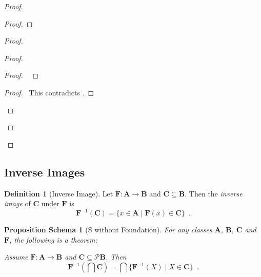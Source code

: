 \documentclass{book}
\let\qed\relax
\newtheorem{props}[ax]{Proposition Schema}
\theoremstyle{definition}
\newtheorem{df}[ax]{Definition}
\begin{document}
\begin{proof}
\pf
{}
\begin{proof}
\end{proof}
\begin{proof}
	\begin{proof}
		\begin{proof}
			\pf\ 
		\end{proof}
		\qedstep
		\begin{proof}
			\pf\ This contradicts .
		\end{proof}
	\end{proof}
\end{proof}
\qed
\end{proof}

\subsection{Inverse Images}

\begin{df}[Inverse Image]
Let $\mathbf{F} : \mathbf{A} \rightarrow \mathbf{B}$ and $\mathbf{C} \subseteq \mathbf{B}$. Then the \emph{inverse image} of $\mathbf{C}$ under $\mathbf{F}$ is
\[ \mathbf{F}^{-1}(\mathbf{C}) = \{ x \in \mathbf{A} \mid \mathbf{F}(x) \in \mathbf{C} \} \enspace . \]
\end{df}

\begin{props}[S without Foundation]
For any classes $\mathbf{A}$, $\mathbf{B}$, $\mathbf{C}$ and $\mathbf{F}$, the following is a theorem:

Assume $\mathbf{F} : \mathbf{A} \rightarrow \mathbf{B}$ and $\mathbf{C} \subseteq \mathcal{P} \mathbf{B}$. Then
\[ \mathbf{F}^{-1} \left( \bigcap \mathbf{C} \right) = \bigcap \{ \mathbf{F}^{-1}(X) \mid X \in \mathbf{C} \} \enspace . \]
\end{props}
\end{document}
